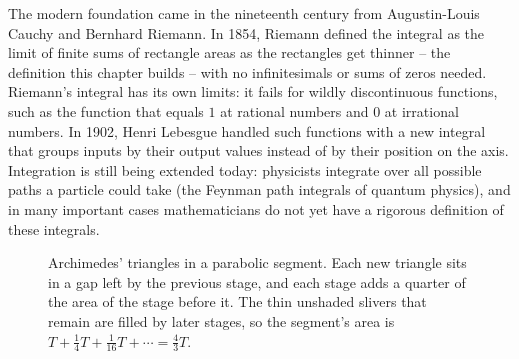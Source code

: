 \begin{historybox}
The modern foundation came in the nineteenth century from Augustin-Louis Cauchy and Bernhard Riemann. In 1854, Riemann defined the integral as the limit of finite sums of rectangle areas as the rectangles get thinner -- the definition this chapter builds -- with no infinitesimals or sums of zeros needed. Riemann's integral has its own limits: it fails for wildly discontinuous functions, such as the function that equals $1$ at rational numbers and $0$ at irrational numbers. In 1902, Henri Lebesgue handled such functions with a new integral that groups inputs by their output values instead of by their position on the axis. Integration is still being extended today: physicists integrate over all possible paths a particle could take (the Feynman path integrals of quantum physics), and in many important cases mathematicians do not yet have a rigorous definition of these integrals.
\end{historybox}

\begin{figure}[htbp]
\centering
{}
\caption{Archimedes' triangles in a parabolic segment. Each new triangle sits in
a gap left by the previous stage, and each stage adds a quarter of the area of
the stage before it. The thin unshaded slivers that remain are filled by later
stages, so the segment's area is $T + \tfrac14 T + \tfrac1{16}T + \cdots =
\tfrac43 T$.}
\label{ch20:fig-parabola-triangles}
\end{figure}

